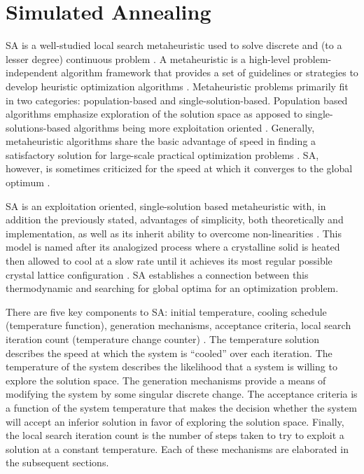 \documentclass[11pt,a4paper,final]{article}
\begin{document}
\section{Simulated Annealing}
\label{sec:simulated-annealing}
SA is a well-studied local search metaheuristic used to solve discrete and (to a lesser degree) continuous problem
\cite{gendreau-2018-handb-metah}. A metaheuristic is a high-level problem-independent algorithm framework that provides
a set of guidelines or strategies to develop heuristic optimization algorithms \cite{radosavljevic-2018-metah-optim}.
Metaheuristic problems primarily fit in two categories: population-based and single-solution-based. Population based
algorithms emphasize exploration of the solution space as apposed to single-solutions-based algorithms being more
exploitation oriented \cite{radosavljevic-2018-metah-optim}. Generally, metaheuristic algorithms share the basic
advantage of speed in finding a satisfactory solution for large-scale practical optimization problems
\cite{radosavljevic-2018-metah-optim}. SA, however, is sometimes criticized for the speed at which it converges to the
global optimum \cite{gendreau-2018-handb-metah,henderson-1989-theor-pract}.

SA is an exploitation oriented, single-solution based metaheuristic with, in addition the previously stated, advantages
of simplicity, both theoretically and implementation, as well as its inherit ability to overcome non-linearities
\cite{gendreau-2018-handb-metah,radosavljevic-2018-metah-optim}. This model is named after its analogized process
where a crystalline solid is heated then allowed to cool at a slow rate until it achieves its most regular possible
crystal lattice configuration \cite{henderson-1989-theor-pract}. SA establishes a connection between this thermodynamic
and searching for global optima for an optimization problem.

There are five key components to SA: initial temperature, cooling schedule (temperature function), generation
mechanisms, acceptance criteria, local search iteration count (temperature change counter)
\cite{keller-2019-multi-objec}. The temperature solution describes the speed at which the system is ``cooled'' over each
iteration. The temperature of the system describes the likelihood that a system is willing to explore the solution
space. The generation mechanisms provide a means of modifying the system by some singular discrete change. The
acceptance criteria is a function of the system temperature that makes the decision whether the system will accept an
inferior solution in favor of exploring the solution space. Finally, the local search iteration count is the number of
steps taken to try to exploit a solution at a constant temperature. Each of these mechanisms are elaborated in the
subsequent sections.
\end{document}
